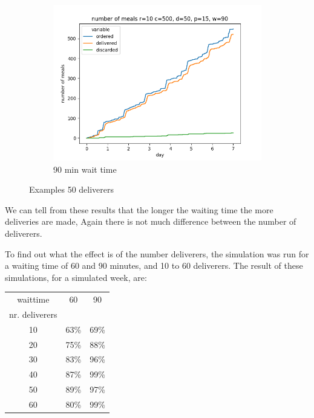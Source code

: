 \begin{center}
\begin{figure}
\begin{subfigure}[m]{0.30\textwidth}
        \end{subfigure}
        \hfill
        \begin{subfigure}[m]{0.30\textwidth}
            \centering
            \includegraphics[width=\textwidth]{sections/run4/week_nd_3_food_ordering_distribution_500_10_50_90}
            \caption{90 min wait time}
        \end{subfigure}
        \caption{Examples 50 deliverers}
        \label{fig:examples 50 deliverers different wait time}
    \end{figure}
\end{center}

We can tell from these results that the longer the waiting time the more deliveries are made,
Again there is not much difference between the number of deliverers.

To find out what the effect is of the number deliverers, the simulation was run for a waiting time of 60 and 90 minutes,
and 10 to 60 deliverers.
The result of these simulations, for a simulated week, are:

\begin{center}
    \begin{tabular}{ |c|c|c| }
        \hline
        waittime       & 60   & 90   \\
        nr. deliverers &      &      \\
        \hline
        \hline
        10             & 63\% & 69\% \\
        \hline
        20             & 75\% & 88\% \\
        \hline
        30             & 83\% & 96\% \\
        \hline
        40             & 87\% & 99\% \\
        \hline
        50             & 89\% & 97\% \\
        \hline
        60             & 80\% & 99\% \\
        \hline
    \end{tabular}
\end{center}

